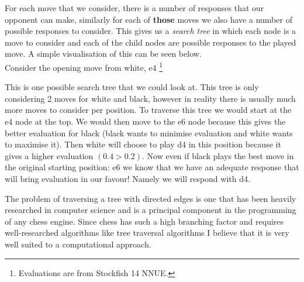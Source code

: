 For each move that we consider, there is a number of 
responses that our opponent can make, similarly for each of 
\textbf{those} moves we also have a number of possible 
responses to consider. This gives us a \textit{search tree}
in which each node is a move to consider and each of the 
child nodes are possible responses to the played move. A 
simple visualisation of this can be seen below.\\

Consider the opening move from white, e4
\footnote{Evaluations are from Stockfish 14 NNUE.}

\begin{center}
\end{center}

This is one possible search tree that we could look at. This
tree is only considering 2 moves for white and black, 
however in reality there is usually much more moves to 
consider per position. To traverse this tree we would start
at the e4 node at the top. We would then move to the e6 node
because this gives the better evaluation for black (black 
wants to minimise evaluation and white wants to maximise it).
Then white will choose to play d4 in this position because
it gives a higher evaluation $(0.4>0.2)$. Now even if black 
plays the best move in the original starting position: e6 
we know that we have an adequate response that will bring 
evaluation in our favour! Namely we will respond with d4.

The problem of traversing a tree with directed edges is one
that has been heavily researched in computer science and is 
a principal component in the programming of any chess engine.
Since chess has such a high branching factor and requires 
well-researched algorithms like tree traversal algorithms I
believe that it is very well suited to a computational 
approach.

